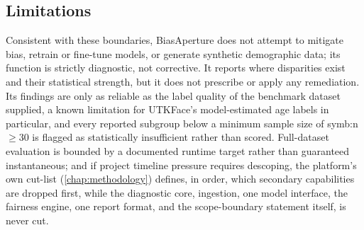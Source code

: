 \subsection{Limitations}
Consistent with these boundaries, BiasAperture does not attempt to mitigate bias, retrain or fine-tune models, or generate synthetic demographic data; its function is strictly diagnostic, not corrective. It reports where disparities exist and their statistical strength, but it does not prescribe or apply any remediation. Its findings are only as reliable as the label quality of the benchmark dataset supplied, a known limitation for UTKFace's model-estimated age labels in particular, and every reported subgroup below a minimum sample size of \gls{symb:n} $\geq 30$ is flagged as statistically insufficient rather than scored. Full-dataset evaluation is bounded by a documented runtime target rather than guaranteed instantaneous; and if project timeline pressure requires descoping, the platform's own cut-list (\cref{chap:methodology}) defines, in order, which secondary capabilities are dropped first, while the diagnostic core, ingestion, one model interface, the fairness engine, one report format, and the scope-boundary statement itself, is never cut.
